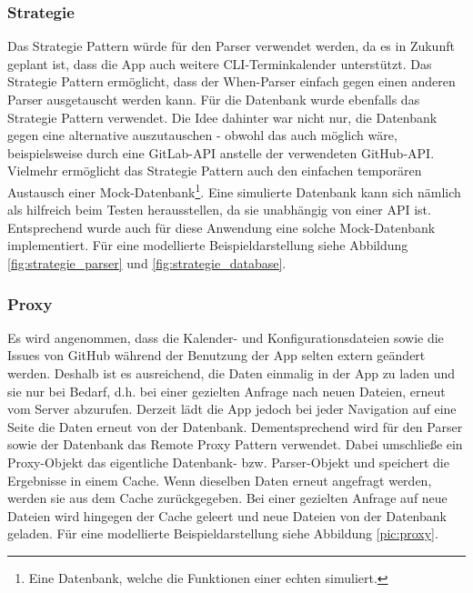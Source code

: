\subsubsection{Strategie}
Das Strategie Pattern würde für den Parser verwendet werden, da es in Zukunft geplant ist, dass die App auch weitere CLI-Terminkalender unterstützt. Das Strategie Pattern ermöglicht, dass der When-Parser einfach gegen einen anderen Parser ausgetauscht werden kann. %
Für die Datenbank wurde ebenfalls das Strategie Pattern verwendet. %
	Die Idee dahinter war nicht nur, die Datenbank gegen eine alternative auszutauschen - obwohl das auch möglich wäre, beispielsweise durch eine GitLab-API anstelle der verwendeten GitHub-API. %
	Vielmehr ermöglicht das Strategie Pattern auch den einfachen temporären Austausch einer Mock-Datenbank\footnote{Eine Datenbank, welche die Funktionen einer echten simuliert.}. Eine simulierte Datenbank kann sich nämlich als hilfreich beim Testen herausstellen, da sie unabhängig von einer API ist. Entsprechend wurde auch für diese Anwendung eine solche Mock-Datenbank implementiert. %
	\newline%
Für eine modellierte Beispieldarstellung siehe Abbildung \ref{fig:strategie_parser} und \ref{fig:strategie_database}.
%
%
%
%
%
\subsubsection{Proxy}%
Es wird angenommen, dass die Kalender- und Konfigurationsdateien sowie die Issues von GitHub während der Benutzung der App selten extern geändert werden. Deshalb ist es ausreichend, die Daten einmalig in der App zu laden und sie nur bei Bedarf, d.h. bei einer gezielten Anfrage nach neuen Dateien, erneut vom Server abzurufen. Derzeit lädt die App jedoch bei jeder Navigation auf eine Seite die Daten erneut von der Datenbank.\newline%
Dementsprechend wird für den Parser sowie der Datenbank das Remote Proxy Pattern verwendet. Dabei umschließe ein Proxy-Objekt das eigentliche Datenbank- bzw. Parser-Objekt und speichert die Ergebnisse in einem Cache. Wenn dieselben Daten erneut angefragt werden, werden sie aus dem Cache zurückgegeben. Bei einer gezielten Anfrage auf neue Dateien wird hingegen der Cache geleert und neue Dateien von der Datenbank geladen.
Für eine modellierte Beispieldarstellung siehe Abbildung \ref{pic:proxy}.
%
%
%
%
%
